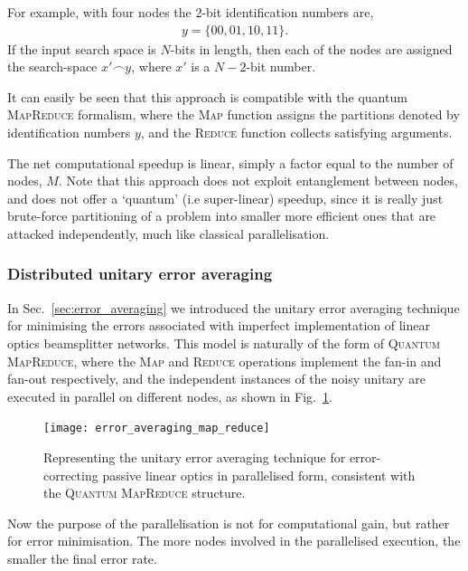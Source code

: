 For example, with four nodes the 2-bit identification numbers are, 
\begin{align}
	y=\{00,01,10,11\}.
\end{align}
If the input search space is $N$-bits in length, then each of the nodes are assigned the search-space \mbox{$x'\frown y$}, where $x'$ is a \mbox{$N-2$}-bit number.

It can easily be seen that this approach is compatible with the quantum \textsc{MapReduce} formalism, where the \textsc{Map} function assigns the partitions denoted by identification numbers $y$, and the \textsc{Reduce} function collects satisfying arguments.

The net computational speedup is linear, simply a factor equal to the number of nodes, $M$. Note that this approach does not exploit entanglement between nodes, and does not offer a `quantum' (i.e super-linear) speedup, since it is really just brute-force partitioning of a problem into smaller more efficient ones that are attacked independently, much like classical parallelisation.


\subsubsection{Distributed unitary error averaging}\label{sec:error_av_parallel}

In Sec.~\ref{sec:error_averaging} we introduced the unitary error averaging technique for minimising the errors associated with imperfect implementation of linear optics beamsplitter networks. This model is naturally of the form of \textsc{Quantum MapReduce}, where the \textsc{Map} and \textsc{Reduce} operations implement the fan-in and fan-out respectively, and the independent instances of the noisy unitary are executed in parallel on different nodes, as shown in Fig.~\ref{fig:error_av_map_reduce}.

\begin{figure}[!htb]
	\texttt{[image: error\_averaging\_map\_reduce]}
	\captionspacefig \caption{Representing the unitary error averaging technique for error-correcting passive linear optics in parallelised form, consistent with the \textsc{Quantum MapReduce} structure.}\label{fig:error_av_map_reduce}
\end{figure}

Now the purpose of the parallelisation is not for computational gain, but rather for error minimisation. The more nodes involved in the parallelised execution, the smaller the final error rate.

